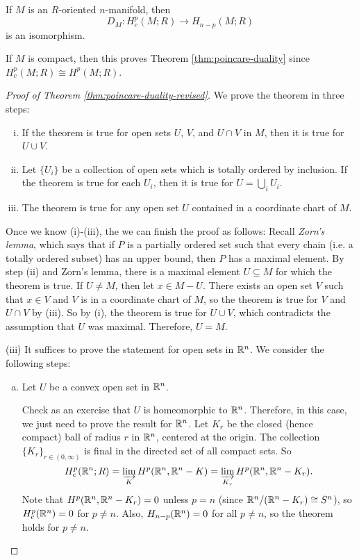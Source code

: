 \begin{theorem}\label{thm:poincare-duality-revised}
  If $M$ is an $R$-oriented $n$-manifold,
  then
  \[D_M : H^p_c(M; R) \to H_{n - p}(M; R)\]
  is an isomorphism.
\end{theorem}

\begin{remark}
  If $M$ is compact, then this
  proves Theorem \ref{thm:poincare-duality}
  since $H^p_c(M; R) \cong H^p(M; R)$.
\end{remark}

\begin{proof}[Proof of Theorem \ref{thm:poincare-duality-revised}]
  We prove the theorem in three steps:
  \begin{enumerate}[(i)]
    \item If the theorem is true for
      open sets $U$, $V$, and $U \cap V$
      in $M$, then it is true for $U \cup V$.
    \item Let $\{U_i\}$ be a collection
      of open sets which is
      totally ordered by inclusion. If
      the theorem is true for each $U_i$,
      then it is true for $U = \bigcup_i U_i$.
    \item The theorem is true for any
      open set $U$ contained in a coordinate
      chart of $M$.
  \end{enumerate}
  Once we know (i)-(iii), the we can
  finish the proof as follows: Recall
  \emph{Zorn's lemma}, which says that
  if $P$ is a partially ordered set
  such that every chain (i.e. a totally
  ordered subset) has an upper bound,
  then $P$ has a maximal element.
  By step (ii) and Zorn's lemma, there is
  a maximal element $U \subseteq M$
  for which the theorem is true. If
  $U \ne M$, then let $x \in M - U$.
  There exists an open set $V$ such that
  $x \in V$ and $V$ is in a coordinate
  chart of $M$, so the theorem is
  true for $V$ and $U \cap V$ by (iii).
  So by (i), the theorem is true for
  $U \cup V$, which contradicts the
  assumption that $U$ was maximal.
  Therefore, $U = M$.

  (iii) It suffices to prove the statement
  for open sets in $\mathbb{R}^n$. We consider
  the following steps:
  \begin{enumerate}[(a)]
    \item Let $U$ be a convex open set in
      $\mathbb{R}^n$.

      Check as an exercise that $U$ is
      homeomorphic to $\mathbb{R}^n$. Therefore,
      in this case,
      we just need to prove the result
      for $\mathbb{R}^n$. Let $K_r$ be the closed
      (hence compact) ball of radius $r$
      in $\mathbb{R}^n$, centered at the origin.
      The collection $\{K_r\}_{r \in (0, \infty)}$
      is final in the directed set of
      all compact sets. So
      \[
        H^p_c(\mathbb{R}^n; R)
        = \varinjlim_{K} H^p(\mathbb{R}^n, \mathbb{R}^n - K)
        = \varinjlim_{K_r} H^p(\mathbb{R}^n, \mathbb{R}^n - K_r).
      \]
      Note that $H^p(\mathbb{R}^n, \mathbb{R}^n - K_r) = 0$
      unless $p = n$ (since
      $\mathbb{R}^n / (\mathbb{R}^n - K_r) \cong S^n$),
      so $H^p_c(\mathbb{R}^n) = 0$ for $p \ne n$.
      Also, $H_{n - p}(\mathbb{R}^n) = 0$
      for all $p \ne n$, so the theorem
      holds for $p \ne n$.


\end{enumerate}
\end{proof}
